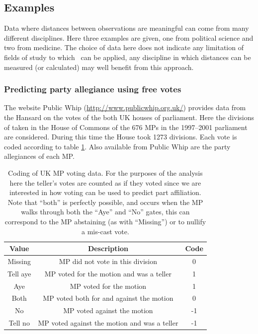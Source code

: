 \subsection{Examples}
\label{gds-examples}

Data where distances between observations are meaningful can come from many different disciplines. Here three examples are given, one from political science and two from medicine. The choice of data here does not indicate any limitation of fields of study to which \mdsds\ can be applied, any discipline in which distances can be measured (or calculated) may well benefit from this approach.

\subsubsection{Predicting party allegiance using free votes}

The website Public Whip (\url{http://www.publicwhip.org.uk/}) provides data from the Hansard on the votes of the both UK houses of parliament. Here the divisions of taken in the House of Commons of the 676 MPs in the 1997--2001 parliament are considered. During this time the House took 1273 divisions. Each vote is coded according to table \ref{voting-code}. Also available from Public Whip are the party allegiances of each MP. 

\begin{table}  
\begin{centering}
\begin{tabular}{ccc}
    Value & Description & Code \\ 
    \hline
    \hline
    Missing & MP did not vote in this division & 0 \\ 
    Tell aye & MP voted for the motion and was a teller & 1 \\ 
    Aye & MP voted for the motion & 1 \\ 
    Both & MP voted both for  and against the motion & 0 \\ 
    No & MP voted against the motion & -1 \\ 
    Tell no & MP voted against the motion and was a teller & -1 \\ 
  \end{tabular}
\caption{Coding of UK MP voting data. For the purposes of the analysis here the teller's votes are counted as if they voted since we are interested in how voting can be used to predict part affiliation. Note that ``both'' is perfectly possible, and occurs when the MP walks through both the ``Aye'' and ``No'' gates, this can correspond to the MP abstaining (as with ``Missing'') or to nullify a mis-cast vote.}
\end{centering}
\label{voting-code}
\end{table}

